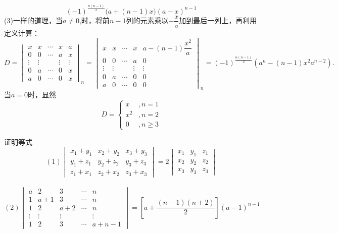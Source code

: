 \begin{solution}
\[(-1)^{\frac{n(n-1)}{2}}\bigg(a+(n-1)x\bigg)(a-x)^{n-1}\]
(3)一样的道理，当$a\neq 0$,时，将前$n-1$列的元素乘以$-\dfrac{x}{a}$加到最后一列上，再利用定义计算：\\\vspace{-5pt}\[D=
\begin{vmatrix}x&x&\cdots&x&a\\0&0&\cdots&a&x\\\vdots&\vdots&&\vdots&\vdots\\0&a&\cdots&0&x\\a&0&\cdots&0&x\end{vmatrix}_n=
\begin{vmatrix}x&x&\cdots&x&a-(n-1)\dfrac{x^2}{a}\\0&0&\cdots&a&0\\\vdots&\vdots&&\vdots&\vdots\\0&a&\cdots&0&0\\a&0&\cdots&0&0\end{vmatrix}_n=(-1)^{\frac{n(n-1)}{2}}(a^n-(n-1)x^2a^{n-2}).\]
当$a=0$时，显然\[D=
\begin{cases}x&,n=1\\x^2&,n=2\\0&,n\ge 3\end{cases}\]
\end{solution}
\begin{example}{证明等式}{}
    \vspace{-5pt}\[(1)\begin{vmatrix}x_1+y_1&x_2+y_2&x_3+y_3\\y_1+z_1&y_2+z_2&y_3+z_3\\z_1+x_1&z_2+x_2&z_3+x_3\end{vmatrix}=2\begin{vmatrix}x_1&y_1&z_1\\x_2&y_2&z_2\\x_3&y_3&z_3\end{vmatrix}\]\\\vspace{-15pt}
    \[(2)\begin{vmatrix}a&2&3&\cdots&n\\1&a+1&3&\cdots&n\\1&2&a+2&\cdots&n\\\vdots&\vdots&\vdots&&\vdots\\1&2&3&\cdots&a+n-1\end{vmatrix}=\left[a+\frac{(n-1)(n+2)}{2}\right](a-1)^{n-1}\]
\end{example}
